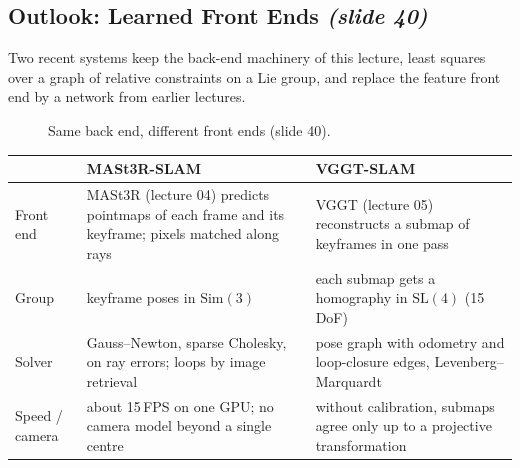 \documentclass[11pt,a4paper]{article}
\newcommand{\slrs}[1]{\texorpdfstring{\emph{(slide #1)}}{(slide #1)}}
\newcommand{\Sim}{\mathrm{Sim}(3)}
\newcommand{\SL}{\mathrm{SL}(4)}
\theoremstyle{definition}
\theoremstyle{plain}
\theoremstyle{remark}
\begin{document}
\subsection{Outlook: Learned Front Ends \slrs{40}}
Two recent systems keep the back-end machinery of this lecture, least squares over a graph of relative constraints on a Lie group, and replace the feature front end by a network from earlier lectures.
\begin{figure}[htbp]\centering
{}
\caption{Same back end, different front ends (slide 40).}
\end{figure}
\begin{center}\small
\begin{tabular}{p{2.6cm}p{6.2cm}p{5.4cm}}
\toprule
 & \textbf{MASt3R-SLAM} & \textbf{VGGT-SLAM}\\\midrule
Front end & MASt3R (lecture 04) predicts pointmaps of each frame and its keyframe; pixels matched along rays & VGGT (lecture 05) reconstructs a submap of keyframes in one pass\\
Group & keyframe poses in $\Sim$ & each submap gets a homography in $\SL$ (15\,DoF)\\
Solver & Gauss--Newton, sparse Cholesky, on ray errors; loops by image retrieval & pose graph with odometry and loop-closure edges, Levenberg--Marquardt\\
Speed / camera & about 15\,FPS on one GPU; no camera model beyond a single centre & without calibration, submaps agree only up to a projective transformation\\\bottomrule
\end{tabular}
\end{center}
\end{document}
